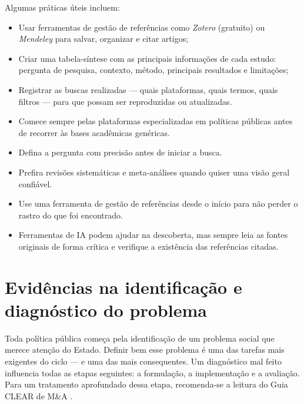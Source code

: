 \documentclass[12pt, a4paper, openany]{book}
\begin{document}
Algumas práticas úteis incluem:

\begin{itemize}[leftmargin=*]
  \item Usar ferramentas de gestão de referências como \textit{Zotero}
    (gratuito) ou \textit{Mendeley} para salvar, organizar e citar artigos;
  \item Criar uma tabela-síntese com as principais informações de cada
    estudo: pergunta de pesquisa, contexto, método, principais resultados e
    limitações;
  \item Registrar as buscas realizadas --- quais plataformas, quais termos,
    quais filtros --- para que possam ser reproduzidas ou atualizadas.
\end{itemize}

\begin{notabox}
\begin{itemize}[leftmargin=*]
  \item Comece sempre pelas plataformas especializadas em políticas públicas
    antes de recorrer às bases acadêmicas genéricas.
  \item Defina a pergunta com precisão antes de iniciar a busca.
  \item Prefira revisões sistemáticas e meta-análises quando quiser uma visão
    geral confiável.
  \item Use uma ferramenta de gestão de referências desde o início para não
    perder o rastro do que foi encontrado.
  \item Ferramentas de IA podem ajudar na descoberta, mas sempre leia as
    fontes originais de forma crítica e verifique a existência das
    referências citadas.
\end{itemize}
\end{notabox}

\chapter{Evidências na identificação e diagnóstico do problema}\label{cap3}

Toda política pública começa pela identificação de um problema social que merece atenção do Estado. Definir bem esse problema é uma das tarefas mais exigentes do ciclo --- e uma das mais consequentes. Um diagnóstico mal feito influencia todas as etapas seguintes: a formulação, a implementação e a avaliação. Para um tratamento aprofundado dessa etapa, recomenda-se a leitura do Guia CLEAR de M\&A \citep{Lima2025}.
\end{document}
